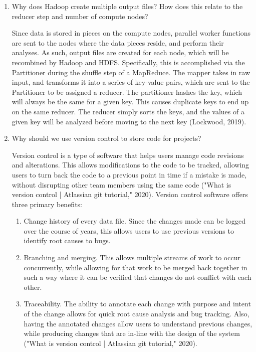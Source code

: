 \documentclass[]{article}
\begin{document}
\begin{enumerate}
	
	\item Why does Hadoop create multiple output files? How does this relate to the reducer step and number of compute nodes?
	
	Since data is stored in pieces on the compute nodes, parallel worker functions are sent to the nodes where the data pieces reside, and perform their analyses. As such, output files are created for each node, which will be recombined by Hadoop and HDFS.  Specifically, this is accomplished via the Partitioner during the shuffle step of a MapReduce.  The mapper takes in raw input, and transforms it into a series of key-value pairs, which are sent to the Partitioner to be assigned a reducer.  The partitioner hashes the key, which will always be the same for a given key.  This causes duplicate keys to end up on the same reducer.  The reducer simply sorts the keys, and the values of a given key will be analyzed before moving to the next key (Lockwood, 2019).
	
	\item Why should we use version control to store code for projects?
	
	Version control is a type of software that helps users manage code revisions and alterations.  This allows modifications to the code to be tracked, allowing users to turn back the code to a previous point in time if a mistake is made, without disrupting other team members using the same code ("What is version control | Atlassian git tutorial," 2020).  Version control software offers three primary benefits:
	\begin{enumerate}
		\item Change history of every data file.  Since the changes made can be logged over the course of years, this allows users to use previous versions to identify root causes to bugs.  
		\item Branching and merging.  This allows multiple streams of work to occur concurrently, while allowing for that work to be merged back together in such a way where it can be verified that changes do not conflict with each other.
		\item Traceability.  The ability to annotate each change with purpose and intent of the change allows for quick root cause analysis and bug tracking.  Also, having the annotated changes allow users to understand previous changes, while producing changes that are in-line with the design of the system ("What is version control | Atlassian git tutorial," 2020).
	\end{enumerate}
	

\end{enumerate}
\end{document}
